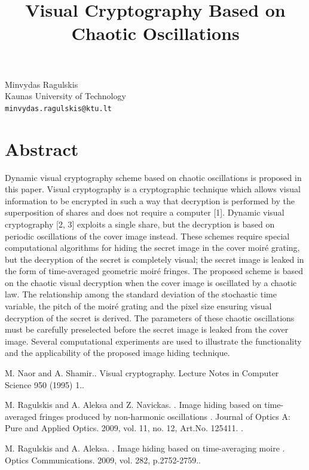 \documentclass[article,A4,11pt]{llncs}%
\begin{document}
\title{Visual Cryptography Based on Chaotic Oscillations}
 \author{} \institute{}
\maketitle
\begin{center}
{\large Minvydas Ragulskis}\\
Kaunas University of Technology\\
{\tt minvydas.ragulskis@ktu.lt}
\end{center}

\section*{Abstract}
Dynamic visual cryptography scheme based on chaotic oscillations is proposed in this paper. Visual cryptography is a cryptographic technique which allows visual information to be encrypted in such a way that decryption is performed by the superposition of shares and does not require a computer [1]. Dynamic visual cryptography [2, 3] exploits a single share, but the decryption is based on periodic oscillations of the cover image instead. These schemes require special computational algorithms for hiding the secret image in the cover moiré grating, but the decryption of the secret is completely visual; the secret image is leaked in the form of time-averaged geometric moiré fringes. The proposed scheme is based on the chaotic visual decryption when the cover image is oscillated by a chaotic law. The relationship among the standard deviation of the stochastic time variable, the pitch of the moiré grating and the pixel size ensuring visual decryption of the secret is derived. The parameters of these chaotic oscillations must be carefully preselected before the secret image is leaked from the cover image. Several computational experiments are used to illustrate the functionality and the applicability of the proposed image hiding
technique.


\begin{thebibliography}{10}
{\sc M. Naor and A. Shamir.}. {Visual cryptography}. Lecture Notes in Computer Science 950 (1995) 1..

{\sc M. Ragulskis and A. Aleksa and Z. Navickas. }. {Image hiding based on time-averaged fringes produced by non-harmonic oscillations }. Journal of Optics A: Pure and Applied Optics. 2009, vol. 11, no. 12, Art.No. 125411. .

{\sc M. Ragulskis and A. Aleksa. }. {Image hiding based on time-averaging moire }. Optics Communications. 2009, vol. 282, p.2752-2759..
\end{thebibliography}
\end{document}
